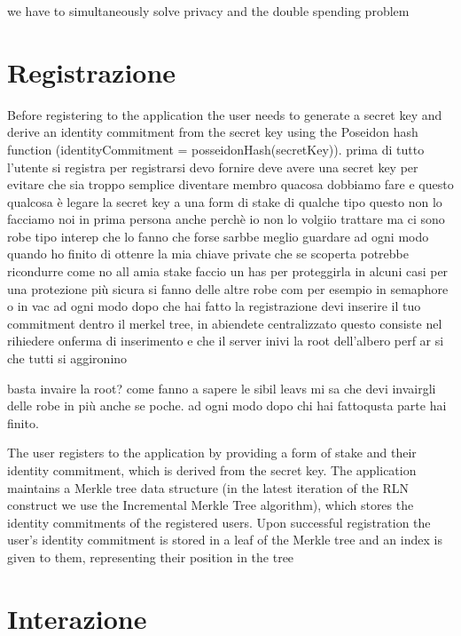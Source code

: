 we have to simultaneously solve privacy and the double spending problem
\section{Registrazione}
Before registering to the application the user needs to generate a secret key and derive an identity commitment from the
secret key using the Poseidon hash function (identityCommitment = posseidonHash(secretKey)). prima di tutto l'utente si
registra per registrarsi devo fornire deve avere una secret key per evitare che sia troppo semplice diventare membro
quacosa dobbiamo fare e questo qualcosa è legare la secret key a una form di stake di qualche tipo questo non lo
facciamo noi in prima persona anche perchè io non lo volgiio trattare ma ci sono robe tipo interep che lo fanno che
forse sarbbe meglio guardare ad ogni modo quando ho finito di ottenre la mia chiave private che se scoperta potrebbe
ricondurre come no all amia stake faccio un has per proteggirla in alcuni casi per una protezione più sicura si fanno
delle altre robe com per esempio in semaphore o in vac ad ogni modo dopo che hai fatto la registrazione devi inserire il
tuo commitment dentro il merkel tree, in abiendete centralizzato questo consiste nel rihiedere onferma di inserimento e
che il server inivi la root dell'albero perf ar si che tutti si aggironino

basta invaire la root? come fanno a sapere le sibil leavs mi sa che devi invairgli delle robe in più anche se poche.
ad ogni modo dopo chi hai fattoqusta parte hai finito.

The user registers to the application by providing a form of stake and their identity commitment, which is derived from
the secret key. The application maintains a Merkle tree data structure (in the latest iteration of the RLN construct we
use the Incremental Merkle Tree algorithm), which stores the identity commitments of the registered users. Upon
successful registration the user’s identity commitment is stored in a leaf of the Merkle tree and an index is given to
them, representing their position in the tree
\section{Interazione}

